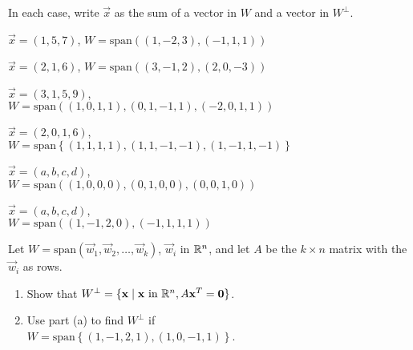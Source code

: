 \documentclass{ximera}
\begin{document}
\begin{problem}
In each case, write $\vec{x}$ as the sum of a vector in $W$ and a vector in $W^\perp$.

\begin{problem}\label{OrthoDecomp1}
$\vec{x} = (1, 5, 7)$, $W = \mbox{span}\left((1, -2, 3), (-1, 1, 1)\right)$
\end{problem}

\begin{problem}\label{OrthoDecomp2}
$\vec{x} = (2, 1, 6)$, $W = \mbox{span}\left((3, -1, 2), (2, 0, -3)\right)$
\end{problem}

\begin{problem}\label{OrthoDecomp3}
$\vec{x} = (3, 1, 5, 9)$, \\ $W = \mbox{span}\left((1, 0, 1, 1), (0, 1, -1, 1), (-2, 0, 1, 1)\right)$
\end{problem}

\begin{problem}\label{OrthoDecomp4}
$\vec{x} = (2, 0, 1, 6)$, \\ \hspace*{-1em}$W = \mbox{span}\left\{(1, 1, 1, 1), (1, 1, -1, -1), (1, -1, 1, -1)\right\}$
\end{problem}

\begin{problem}\label{OrthoDecomp5}
$\vec{x} = (a, b, c, d)$, \\ $W = \mbox{span}\left((1, 0, 0, 0), (0, 1, 0, 0), (0, 0, 1, 0)\right)$
\end{problem}

\begin{problem}\label{OrthoDecomp6}
$\vec{x} = (a, b, c, d)$, \\ $W = \mbox{span}\left((1, -1, 2, 0), (-1, 1, 1, 1)\right)$
\end{problem}
\end{problem}
	

\begin{problem}\label{Uperp}
Let $W = \mbox{span}\left(\vec{w}_{1}, \vec{w}_{2}, \dots, \vec{w}_{k}\right)$, $\vec{w}_{i}$ in $\mathbb{R}^n$, and let $A$ be the $k \times n$ matrix with the $\vec{w}_{i}$ as rows.


\begin{enumerate}
\item Show that $W^\perp = \{\mathbf{x} \mid  \mathbf{x} \mbox{ in } \mathbb{R}^n, A\mathbf{x}^{T} = \mathbf{0}\}$.

\item Use part (a) to find $W^\perp$ if \\ $W = \mbox{span}\left\{(1, -1, 2, 1), (1, 0, -1, 1)\right\}$.
\end{enumerate}

\end{problem}
\end{document}
